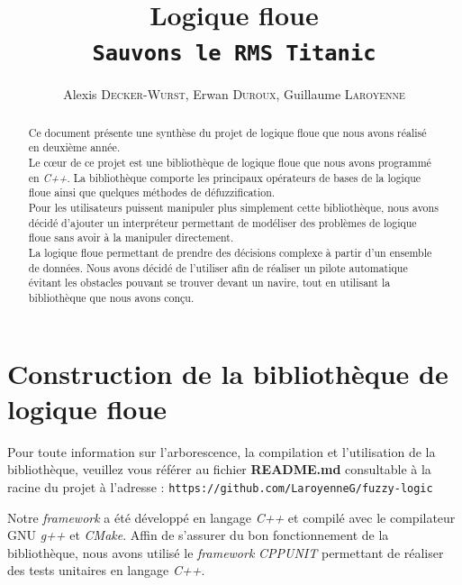 \documentclass[a4paper,11pt]{article}
\title{Logique floue\\\texttt{Sauvons le RMS Titanic}}
\author{Alexis \textsc{Decker-Wurst}, Erwan  \textsc{Duroux}, Guillaume  \textsc{Laroyenne}}
\begin{document}
    \maketitle

    \begin{abstract}
        Ce document présente une synthèse du projet de logique floue que nous avons réalisé en deuxième année.\\
        Le cœur de ce projet est une bibliothèque de logique floue que nous avons programmé en \textit{C++}. La bibliothèque comporte les principaux opérateurs de bases de la logique floue ainsi que quelques méthodes de défuzzification.\\
        Pour les utilisateurs puissent manipuler plus simplement cette bibliothèque, nous avons décidé d'ajouter un interpréteur permettant de modéliser des problèmes de logique floue sans avoir à la manipuler directement.\\
        La logique floue permettant de prendre des décisions complexe à partir d'un ensemble de données. Nous avons décidé de l'utiliser afin de réaliser un pilote automatique évitant les obstacles pouvant se trouver devant un navire, tout en utilisant la bibliothèque que nous avons conçu.
    \end{abstract}

    \section{Construction de la bibliothèque de logique floue}

    \begin{center}
        Pour toute information sur l'arborescence, la compilation et l'utilisation de la bibliothèque, veuillez vous référer au fichier \textbf{README.md} consultable à la racine du projet à l’adresse : \texttt{https://github.com/LaroyenneG/fuzzy-logic}
    \end{center}

    Notre \textit{framework} a été développé en langage \textit{C++} et compilé avec le compilateur GNU \textit{g++} et \textit{CMake}.
    Affin de s’assurer du bon fonctionnement de la bibliothèque, nous avons utilisé le \textit{framework} \textit{CPPUNIT} permettant de réaliser des tests unitaires en langage \textit{C++}.
\end{document}
